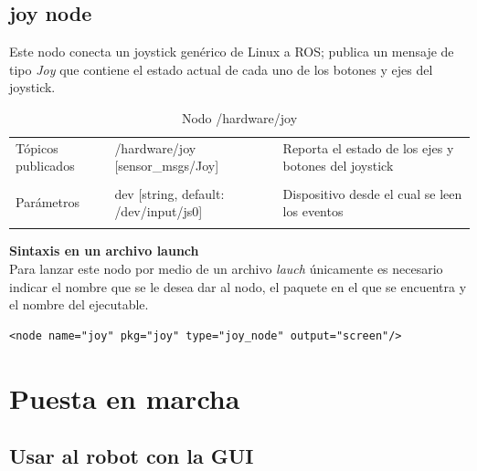 \documentclass[user_manual.tex]{subfiles}
\begin{document}
\subsection{joy node}

Este nodo conecta un joystick genérico de Linux a ROS; publica un mensaje de tipo \textit{Joy} que contiene el estado actual de cada uno de los botones y ejes del joystick.

\begin{table}[H]
\begin{center}
\begin{tabular}{|l|p{6.5cm}|p{4.5cm}|}%
\hline

Tópicos publicados
& /hardware/joy [sensor\_msgs/Joy] & Reporta el estado de los ejes y botones del joystick \\
& & \\
\hline

Parámetros
&  dev [string, default: /dev/input/js0] & Dispositivo desde el cual se leen los eventos \\
& & \\
\hline

\end{tabular}
\caption{Nodo /hardware/joy}
\label{joy node}
\end{center}
\end{table}

\textbf{Sintaxis en un archivo launch}\\
Para lanzar este nodo por medio de un archivo \textit{lauch} únicamente es necesario indicar el nombre que se le desea dar al nodo, el paquete en el que se encuentra y el nombre del ejecutable.
\\
\begin{verbatim}
<node name="joy" pkg="joy" type="joy_node" output="screen"/>
\end{verbatim}

\section{Puesta en marcha}
\subsection{Usar al robot con la GUI}
\label{sec:GUI}

 
 
\end{document}
